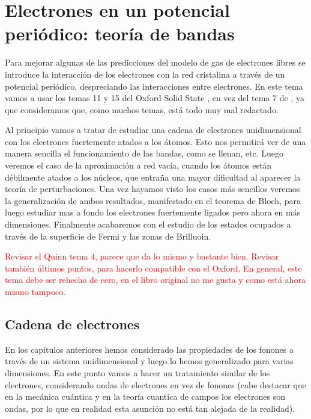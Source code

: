 \chapter{Electrones en un potencial periódico: teoría de bandas} \label{Ch:07}


Para mejorar algunas de las predicciones del modelo de gas de electrones libres se introduce la interacción de los electrones con la red cristalina a través de un potencial periódico, despreciando las interacciones entre electrones. En este tema vamos a usar los temas 11 y 15 del Oxford Solid State \cite{Oxford_Solid_State}, en vez del tema 7 de \cite{Fisica_del_Estado_Solido}, ya que consideramos que, como muchos temas, está todo muy mal redactado.

Al principio vamos a tratar de estudiar una cadena de electrones unidimensional con los electrones fuertemente atados a los átomos. Esto nos permitirá ver de una manera sencilla el funcionamiento de las bandas, como se llenan, etc. Luego veremos el caso de la aproximación a red vacía, cuando los átomos están débilmente atados a los núcleos, que entraña una mayor dificultad al aparecer la teoría de perturbaciones. Una vez hayamos visto los casos más sencillos veremos la generalización de ambos resultados, manifestado en el teorema de Bloch, para luego estudiar mas a fondo los electrones fuertemente ligados pero ahora en más dimensiones. Finalmente acabaremos con el estudio de los estados ocupados a través de la superficie de Fermi y las zonas de Brilluoin.

\begin{Anotacion}
	\textcolor{red}{Revisar el Quinn \cite{Quiin} tema 4, parece que da lo mismo y bastante bien. Revisar también últimos puntos, para hacerlo compatible con el Oxford. En general, este tema debe ser rehecho de cero, en el libro original no me gusta y como está ahora mismo tampoco.}
\end{Anotacion}

\section{Cadena de electrones}

En los capítulos anteriores hemos considerado las propiedades de los fonones a través de un sistema unidimensional y luego lo hemos generalizado para varias dimensiones. En este punto vamos a hacer un tratamiento similar de los electrones, considerando ondas de electrones en vez de fonones (cabe destacar que en la mecánica cuántica y en la teoría cuantica de campos los electrones son ondas, por lo que en realidad esta asunción no está tan alejada de la realidad).

